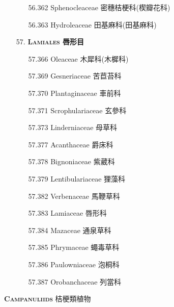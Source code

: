 \begin{enumerate}
\begin{enumerate}
      \item[56.362] Sphenocleaceae 密穗桔梗科(楔瓣花科)  
        
      \item[56.363] Hydroleaceae 田基麻科(田基麻科)  
        
    \end{enumerate}
  \item[57. ] \textbf{\textsc{Lamiales} 唇形目} 
    \begin{enumerate}
      \item[57.366] Oleaceae 木犀科(木樨科)  
        
      \item[57.369] Gesneriaceae 苦苣苔科  
        
      \item[57.370] Plantaginaceae 車前科  
        
      \item[57.371] Scrophulariaceae 玄參科  
        
      \item[57.373] Linderniaceae 母草科  
        
      \item[57.377] Acanthaceae 爵床科  
        
      \item[57.378] Bignoniaceae 紫葳科  
        
      \item[57.379] Lentibulariaceae 狸藻科  
        
      \item[57.382] Verbenaceae 馬鞭草科  
        
      \item[57.383] Lamiaceae 唇形科  
        
      \item[57.384] Mazaceae 通泉草科  
        
      \item[57.385] Phrymaceae 蠅毒草科  
        
      \item[57.386] Paulowniaceae 泡桐科  
        
      \item[57.387] Orobanchaceae 列當科  
        
    \end{enumerate}
\end{enumerate}
\vspace{2ex} 
\noindent \normalsize\textsc{\textbf{Campanuliids} 桔梗類植物}\selectfont \\
\footnotesize\selectfont
